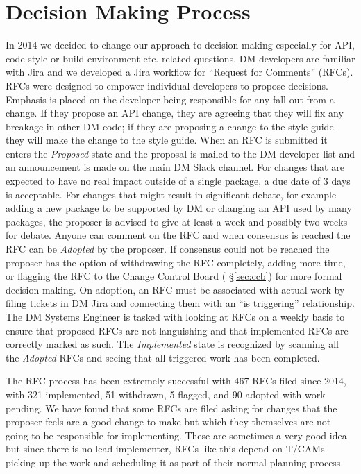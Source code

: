 \section{Decision Making Process}
In 2014 we decided to change our approach to decision making especially for API, code style or build  environment etc. related questions.
DM developers are familiar with Jira and we developed a Jira workflow for ``Request for Comments'' (RFCs).
RFCs were designed to empower individual developers to propose decisions.
Emphasis is placed on the developer being responsible for any fall out from a change.
If they propose an API change, they are agreeing that they will fix any breakage in other DM code; if they are proposing a change to the style guide they will make the change to the style guide.
When an RFC is submitted it enters the \emph{Proposed} state and the proposal is mailed to the DM developer list and an announcement is made on the main DM Slack channel.
For changes that are expected to have no real impact outside of a single package, a due date of 3 days is acceptable.
For changes that might result in significant debate, for example adding a new package to be supported by DM or changing an API used by many packages, the proposer is advised to give at least a week and possibly two weeks for debate.
Anyone can comment on the RFC and when consensus is reached the RFC can be \emph{Adopted} by the proposer.
If consensus could not be reached the proposer has the option of withdrawing the RFC completely, adding more time, or flagging the RFC to the Change Control Board ( \S\ref{sec:ccb}) for more formal decision making.
On adoption, an RFC must be associated with actual work by filing tickets in DM Jira and connecting them with an ``is triggering'' relationship.
The DM Systems Engineer is tasked with looking at RFCs on a weekly basis to ensure that proposed RFCs are not languishing and that implemented RFCs are correctly marked as such.
The \emph{Implemented} state is recognized by scanning all the \emph{Adopted} RFCs and seeing that all triggered work has been completed.

The RFC process has been extremely successful with 467 RFCs filed since 2014, with 321 implemented, 51 withdrawn, 5 flagged, and 90 adopted with work pending.
We have found that some RFCs are filed asking for changes that the proposer feels are a good change to make but which they themselves are not going to be responsible for implementing.
These are sometimes a very good idea but since there is no lead implementer, RFCs like this depend on T/CAMs picking up the work and scheduling it as part of their normal planning process.

